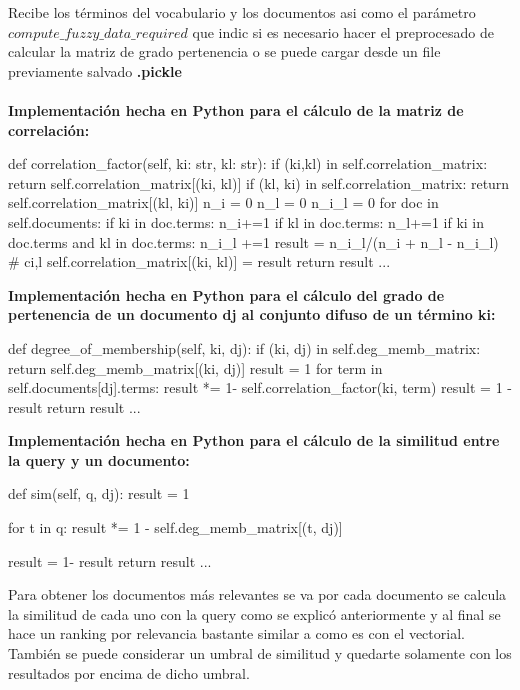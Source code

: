 \documentclass{llncs}
\begin{document}
Recibe los términos del vocabulario y los documentos asi como el parámetro $compute\_fuzzy\_data\_required$
que indic si es necesario hacer el preprocesado de calcular la matriz de grado pertenencia o se 
puede cargar desde un file previamente salvado \textbf{.pickle}\\\\
\noindent
\textbf{Implementación hecha en Python para el c\'alculo de la matriz de correlación:}
\begin{python}
def correlation_factor(self, ki: str, kl: str):
    if (ki,kl) in self.correlation_matrix:
        return self.correlation_matrix[(ki, kl)]
    if (kl, ki) in self.correlation_matrix:
        return self.correlation_matrix[(kl, ki)]
    n_i = 0  
    n_l = 0
    n_i_l = 0 
    for doc in self.documents:
        if ki in doc.terms:
            n_i+=1
        if kl in doc.terms:
            n_l+=1
        if ki in doc.terms and kl in doc.terms:
            n_i_l +=1
    result = n_i_l/(n_i + n_l - n_i_l) # ci,l
    self.correlation_matrix[(ki, kl)] = result
    return result
...
\end{python}
\textbf{Implementación hecha en Python para el c\'alculo del grado de pertenencia 
de un documento dj al conjunto difuso de un término ki:}\\
\begin{python}
    def degree_of_membership(self, ki, dj): 
        if (ki, dj) in self.deg_memb_matrix:
            return self.deg_memb_matrix[(ki, dj)]
        result = 1
        for term in self.documents[dj].terms:
            result *= 1- self.correlation_factor(ki, term)
        result = 1 - result
        return result
    ...
\end{python}

\noindent
\textbf{Implementación hecha en Python para el cálculo de la similitud 
entre la query y un documento:}\\

\begin{python}
    def sim(self, q, dj): 
        result = 1

        for t in q:
            result *= 1 - self.deg_memb_matrix[(t, dj)]

        result = 1- result
        return result
    ...
\end{python}


Para obtener los documentos más relevantes se va por cada documento se calcula 
la similitud de cada uno con la query como se explicó anteriormente y al 
final se hace un ranking por relevancia bastante similar a como es con el vectorial.
También se puede considerar un umbral de similitud y quedarte solamente con los resultados
por encima de dicho umbral.
\end{document}
